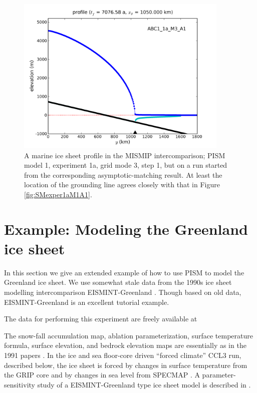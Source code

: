 \documentclass[11pt,final]{amsart}
\begin{document}
\begin{figure}[ht]
\includegraphics[width=4.0in,keepaspectratio=true]{profile_EBU1_1a_M3_A1}
\caption{A marine ice sheet profile in the MISMIP intercomparison; PISM model 1, experiment 1a, grid mode 3, step 1, but on a run started from the corresponding asymptotic-matching result.  At least the location of the grounding line agrees closely with that in Figure \ref{fig:SMexper1aM1A1}.}
\label{fig:MISMIPmodel1exper1aM3A1FROMSM}
\end{figure}


\clearpage\newpage

\section{Example: Modeling the Greenland ice sheet}\label{sect:green}  

In this section we give an extended example of how to use PISM to model the Greenland ice sheet.  We use somewhat stale data from the 1990s ice sheet modelling intercomparison EISMINT-Greenland \cite{HuybrechtsEISMINT,RitzEISMINT}.  Though based on old data, EISMINT-Greenland is an excellent tutorial example.

The data for performing this experiment are freely available at
\medskip

\centerline{}
\medskip

\noindent The snow-fall accumulation map, ablation parameterization, surface temperature formula, surface elevation, and bedrock elevation maps are essentially as in the 1991 papers \cite{Letreguillyetal1991,OhmuraReeh}.  In the ice and sea floor-core driven ``forced climate'' CCL3 run, described below, the ice sheet is forced by changes in surface temperature from the GRIP core \cite{Dansgaardetal1993} and by changes in sea level from SPECMAP \cite{Imbrieetal1984}.  A parameter-sensitivity study of a EISMINT-Greenland type ice sheet model is described in \cite{RitzFabreLetreguilly}.
\end{document}
